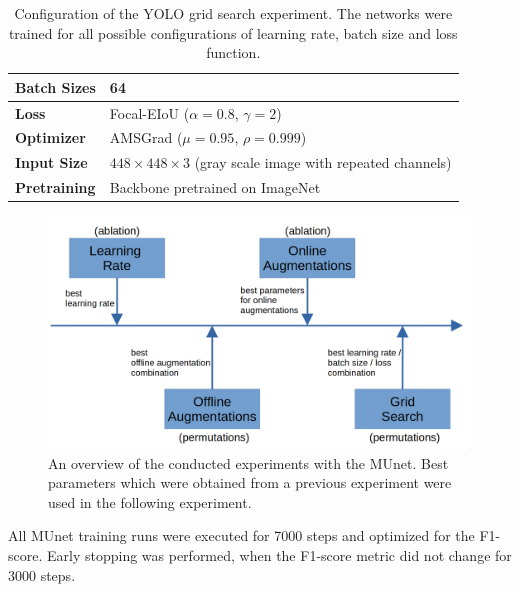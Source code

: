 \begin{table}[b]
\footnotesize
\begin{center}
\begin{tabular}{|l|l|}

\hline
\textbf{Batch Sizes} & 64\\
\hline
\textbf{Loss} & Focal-EIoU ($\alpha = 0.8$, $\gamma = 2$) \\
\hline
\textbf{Optimizer} & AMSGrad ($\mu = 0.95$, $\rho = 0.999$) \\
\hline
\textbf{Input Size} & $448 \times 448 \times 3$ (gray scale image with repeated channels) \\
\hline
\textbf{Pretraining} & Backbone pretrained on ImageNet \\
\hline

\end{tabular}
\caption{Configuration of the YOLO grid search experiment. The networks were trained for all possible configurations of learning rate, batch size and loss function.}
\label{tab:munet_config}
\end{center}
\end{table}

\begin{figure}[t]
\begin{center}
    \includegraphics[width=12cm]{imgs/experiments_overview_munet.png}
    \caption{An overview of the conducted experiments with the \ac{MUnet}. Best parameters which were obtained from a previous experiment were used in the following experiment.}
    \label{fig:munet_experiments_overview}
\end{center}
\end{figure}


All \ac{MUnet} training runs were executed for 7000 steps and optimized for the F1-score.
Early stopping was performed, when the F1-score metric did not change for 3000 steps.

